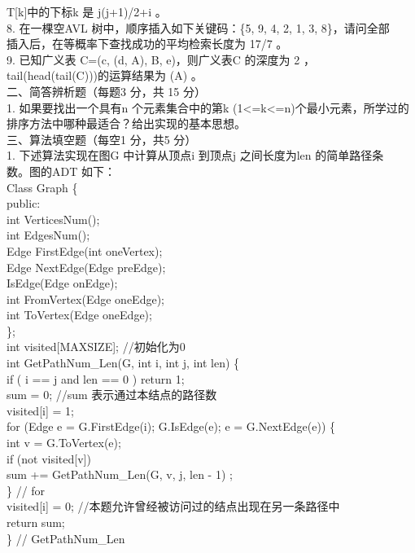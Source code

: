 \begin{question}
T[k]中的下标k 是     j(j+1)/2+i       。\\
8. 在一棵空AVL 树中，顺序插入如下关键码：\{5, 9, 4, 2, 1, 3, 8\}，请问全部\\
插入后，在等概率下查找成功的平均检索长度为  17/7     。\\
9. 已知广义表 C=(c, (d, A), B, e)，则广义表C 的深度为   2     ，\\
tail(head(tail(C)))的运算结果为  (A)     。\\
二、简答辨析题（每题3 分，共 15 分）\\
1. 如果要找出一个具有n 个元素集合中的第k (1<=k<=n)个最小元素，所学过的\\
排序方法中哪种最适合？给出实现的基本思想。\\
三、算法填空题（每空1 分，共5 分）\\
1. 下述算法实现在图G 中计算从顶点i 到顶点j 之间长度为len 的简单路径条\\
数。图的ADT 如下：\\
Class Graph \{\\
public:\\
int VerticesNum();\\
int EdgesNum();\\
Edge FirstEdge(int oneVertex);\\
Edge NextEdge(Edge preEdge);\\
IsEdge(Edge onEdge);\\
int FromVertex(Edge oneEdge);\\
int ToVertex(Edge oneEdge);\\
\};\\
int visited[MAXSIZE];     //初始化为0\\
int GetPathNum\_Len(G, int i, int j, int len)  \{\\
if (      i == j and len == 0         )  return 1;\\
sum = 0;             //sum 表示通过本结点的路径数\\
visited[i] = 1;\\
for (Edge e = G.FirstEdge(i); G.IsEdge(e); e = G.NextEdge(e)) \{\\
int v = G.ToVertex(e);\\
if (not visited[v])\\
sum += GetPathNum\_Len(G, v, j, len - 1) ;\\
\} // for\\
visited[i] = 0; //本题允许曾经被访问过的结点出现在另一条路径中\\
return sum;\\
\} // GetPathNum\_Len\\

\end{question}
